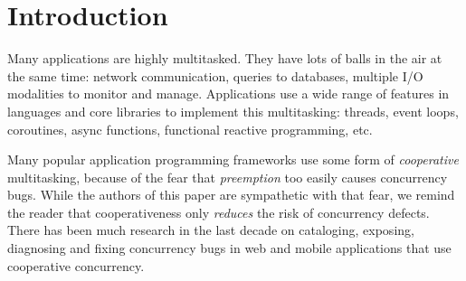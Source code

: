 \documentclass[acmsmall,anonymous,review]{acmart}\settopmatter{printfolios=true,printccs=false,printacmref=false}
\begin{document}

\maketitle




\section{Introduction}

Many applications are highly multitasked.
They have lots of balls in the air at the same time: network communication, queries to databases, multiple I/O modalities to monitor and manage.
Applications use a wide range of features in languages and core libraries to implement this multitasking: threads, event loops, coroutines, async functions, functional reactive programming, etc.\footnotemark{}


Many popular application programming frameworks use some form of \emph{cooperative} multitasking, because of the fear that \emph{preemption} too easily causes concurrency bugs.
While the authors of this paper are sympathetic with that fear, we remind the reader that cooperativeness only \emph{reduces} the risk of concurrency defects\footnotemark{}.
There has been much research in the last decade on cataloging, exposing, diagnosing and fixing concurrency bugs in web and mobile applications that use cooperative concurrency.
\end{document}
